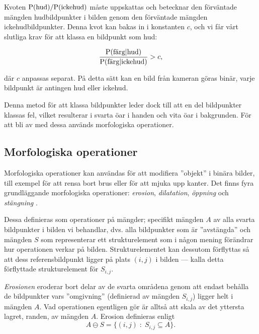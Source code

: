 \documentclass[../rapport_MVEX01-11-05]{subfiles}
\begin{document}
Kvoten $\mathrm{P}(\textrm{hud})/\mathrm{P}(\textrm{ickehud})$ måste uppskattas och betecknar
den förväntade mängden hudbildpunkter i bilden genom den förväntade mängden
ickehudbildpunkter. Denna kvot kan bakas in i konstanten $c$, och vi
får vårt slutliga krav för att klassa en bildpunkt som hud:

\begin{equation*}
	\frac{\mathrm{P}(\textrm{färg}|\textrm{hud})}{\mathrm{P}(\textrm{färg}|\textrm{ickehud})} > c,
\end{equation*}

där $c$ anpassas separat. På detta sätt kan en bild från kameran göras
binär, varje bildpunkt är antingen hud eller ickehud.

Denna metod för att klassa bildpunkter leder dock till att en del
bildpunkter klassas fel, vilket resulterar i svarta öar i handen
och vita öar i bakgrunden. För att bli av med dessa används
morfologiska operationer.

\subsection{Morfologiska operationer}\label{sec:morph}

Morfologiska operationer kan användas för att modifiera ''objekt'' i
binära bilder, till exempel för att rensa bort brus eller för att
mjuka upp kanter. Det finns fyra grundläggande morfologiska
operationer: \emph{erosion}, \emph{dilatation}, \emph{öppning} och
\emph{stängning} \cite[s.~25]{Rudemo09}.

Dessa definieras som operationer på mängder; specifikt mängden $A$
av alla svarta bildpunkter i bilden vi behandlar, dvs. alla bildpunkter som är
''avstängda'' och mängden $S$ som representerar ett strukturelement
som i någon mening förändrar hur operationen verkar på bilden.
Strukturelementet kan dessutom förflyttas så att dess referensbildpunkt
ligger på plats $(i,j)$ i bilden --- kalla detta förflyttade
strukturelement för $S_{i,j}$.

\emph{Erosionen} eroderar bort delar av de svarta områdena genom
att endast behålla de bildpunkter vars ''omgivning'' (definierad av mängden
$S_{i,j}$) ligger helt i mängden $A$. Vad operationen egentligen gör är alltså
att skala av det yttersta lagret, randen, av mängden $A$. Erosion definieras enligt
\begin{equation*}
  A\ominus S = \{(i,j)\;:\;S_{i,j}\subseteq A\}.
\end{equation*}
\end{document}
